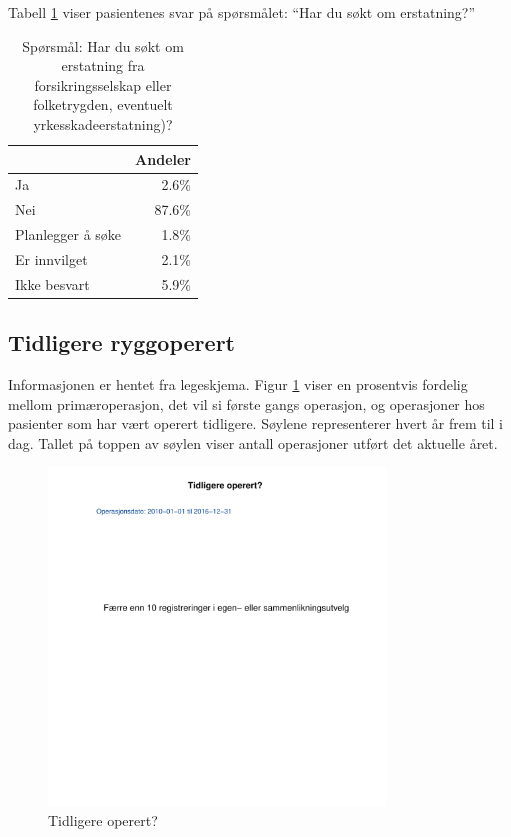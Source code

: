 \documentclass [norsk,a4paper,twoside]{article}\usepackage[]{graphicx}\usepackage[]{color}
\begin{document}
Tabell \ref{tab:Erst} viser pasientenes svar på spørsmålet: ``Har du søkt om erstatning?'' 

\begin{table}[ht]
\centering
\begin{tabular}{lr}
  \hline
 & Andeler \\ 
  \hline
Ja & 2.6\% \\ 
  Nei & 87.6\% \\ 
  Planlegger å søke & 1.8\% \\ 
  Er innvilget & 2.1\% \\ 
  Ikke besvart & 5.9\% \\ 
   \hline
\end{tabular}
\caption{Spørsmål: Har du søkt om erstatning fra forsikringsselskap eller folketrygden, 
		eventuelt yrkesskadeerstatning)?} 
\label{tab:Erst}
\end{table}



\subsection{Tidligere ryggoperert}
Informasjonen er hentet fra legeskjema.
Figur \ref{fig:TidlOp} viser en prosentvis fordelig mellom primæroperasjon, det vil si første gangs 
operasjon, og operasjoner hos pasienter som har vært operert tidligere.  
Søylene representerer hvert år frem til i dag. Tallet på toppen av søylen viser antall operasjoner utført 
det aktuelle året.



\begin{figure}[ht]
	\centering \includegraphics[width= 0.8\textwidth]{TidlOp.pdf}
	\caption{\label{fig:TidlOp} Tidligere operert? }
\end{figure}
\end{document}
